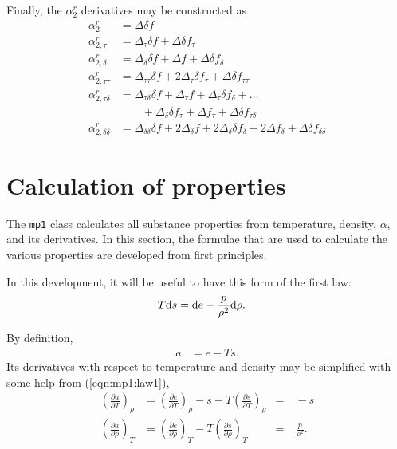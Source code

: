 Finally, the $\alpha_2^r$ derivatives may be constructed as
\begin{subequations}
\begin{align}
\alpha^r_2 &= \Delta \delta f\\
\alpha^r_{2,\tau} &= \Delta_\tau \delta f + \Delta \delta f_\tau\\
\alpha^r_{2,\delta} &= \Delta_\delta \delta f + \Delta f + \Delta \delta f_\delta\\
\alpha^r_{2,\tau\tau} &= \Delta_{\tau\tau} \delta f + 2 \Delta_\tau \delta f_\tau + \Delta \delta f_{\tau\tau}\\
\alpha^r_{2,\tau\delta} &= \Delta_{\tau\delta} \delta f + \Delta_{\tau} f + \Delta_\tau \delta f_\delta + \ldots \nonumber\\
 &\hspace{2em} + \Delta_\delta \delta f_\tau+ \Delta f_\tau + \Delta \delta f_{\tau\delta}\\
\alpha^r_{2,\delta\delta} &= \Delta_{\delta\delta} \delta f + 2\Delta_\delta f + 2\Delta_\delta \delta f_\delta + 2\Delta f_\delta + \Delta \delta f_{\delta\delta}
\end{align}
\end{subequations}

\section{Calculation of properties}\label{sec:mp1:properties}

The \texttt{mp1} class calculates all substance properties from temperature, density, $\alpha$, and its derivatives.  In this section, the formulae that are used to calculate the various properties are developed from first principles.

In this development, it will be useful to have this form of the first law:
\begin{align}
T\mathrm{d} s &= \mathrm{d} e - \frac{p}{\rho^2} \mathrm{d} \rho\label{eqn:mp1:law1}.
\end{align}

By definition,
\begin{align}
a &= e - Ts \label{eqn:mp1:a}.
\end{align}
Its derivatives with respect to temperature and density may be simplified with some help from (\ref{eqn:mp1:law1}),
\begin{align}
\left(\frac{\partial a}{\partial T}\right)_\rho &= \left(\frac{\partial e}{\partial T}\right)_\rho - s - T \left(\frac{\partial s}{\partial T}\right)_\rho &=& \ -s\label{eqn:mp1:at}\\
\left(\frac{\partial a}{\partial \rho}\right)_T &= \left(\frac{\partial e}{\partial \rho}\right)_T - T \left(\frac{\partial s}{\partial \rho}\right)_T &=& \ \frac{p}{\rho^2} \label{eqn:mp1:ad}.
\end{align}

